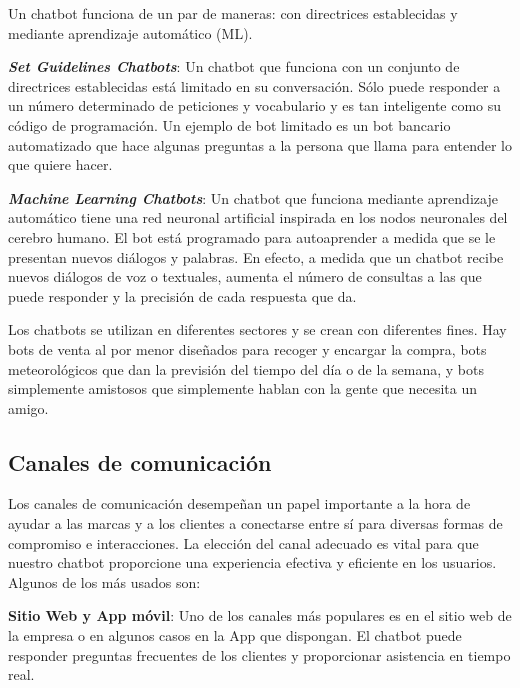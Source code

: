 Un chatbot funciona de un par de maneras: con directrices establecidas y mediante aprendizaje automático (ML).{\vspace{0.3cm}

\textit{\textbf{Set Guidelines Chatbots}}: Un chatbot que funciona con un conjunto de directrices establecidas está limitado en su conversación. Sólo puede responder a un número determinado de peticiones y vocabulario y es tan inteligente como su código de programación. Un ejemplo de bot limitado es un bot bancario automatizado que hace algunas preguntas a la persona que llama para entender lo que quiere hacer.{\vspace{0.3cm}


\textit{\textbf{Machine Learning Chatbots}}: Un chatbot que funciona mediante aprendizaje automático tiene una red neuronal artificial inspirada en los nodos neuronales del cerebro humano. El bot está programado para autoaprender a medida que se le presentan nuevos diálogos y palabras. En efecto, a medida que un chatbot recibe nuevos diálogos de voz o textuales, aumenta el número de consultas a las que puede responder y la precisión de cada respuesta que da.


Los chatbots se utilizan en diferentes sectores y se crean con diferentes fines. Hay bots de venta al por menor diseñados para recoger y encargar la compra, bots meteorológicos que dan la previsión del tiempo del día o de la semana, y bots simplemente amistosos que simplemente hablan con la gente que necesita un amigo.

\subsection{Canales de comunicación}

Los canales de comunicación desempeñan un papel importante a la hora de ayudar a las marcas y a los clientes a conectarse entre sí para diversas formas de compromiso e interacciones. La elección del canal adecuado es vital para que nuestro chatbot proporcione una experiencia efectiva y eficiente en los usuarios. Algunos de los más usados son:\vspace{0.3cm}

\textbf{Sitio Web y App móvil}: Uno de los canales más populares es en el sitio web de la empresa o en algunos casos en la App que dispongan. El chatbot puede responder preguntas frecuentes de los clientes y proporcionar asistencia en tiempo real.\vspace{0.3cm}

}}
